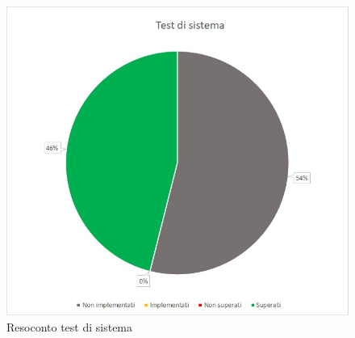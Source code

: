 \begin{figure} [H]
	\centering
	\includegraphics[scale=1]{Img/TS}
	\caption{Resoconto test di sistema}\label{}
\end{figure}
\newpage

